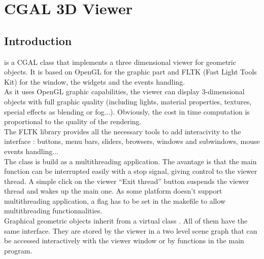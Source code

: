 
\chapter{CGAL 3D Viewer}

\section{Introduction}
 is a CGAL class that implements a three dimensional viewer for 
geometric objects. It is based on OpenGL for the graphic part and FLTK 
(Fast Light Tools Kit)
for the window, the widgets and the events handling. \\
As it uses OpenGL graphic capabilities, the viewer can display
3-dimensional objects with full graphic quality (including lights,
material properties, textures, special effects as blending
or fog...). Obviously, the cost in time computation is proportional
to the quality of the rendering.\\
The FLTK library provides all the necessary tools to add
interacivity to the interface : buttons, menu bars, sliders,
browsers, windows and subwindows, mouse events handling...\\
The class  is build as a multithreading application. The avantage is 
that the main function can be interrupted easily with a stop signal,
giving control to the viewer thread. A simple click on the viewer
``Exit thread'' button suspends the viewer thread and wakes up the main
one. As some platform doesn't support multithreading application, a
flag  has to be set in the makefile to allow
multithreading functionnalities.\\
Graphical geometric objects inherit from a virtual class 
. All of them have the same interface. They are stored by the
viewer in a two level scene graph that can be accessed interactively
with the viewer window or by functions in the main program.



